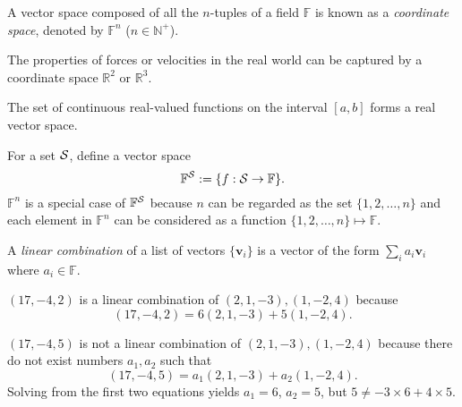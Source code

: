 \begin{defn}
  \label{def:coordinateSpace}
  A vector space composed of all the $n$-tuples of a field
  $\mathbb{F}$
  is known as a \emph{coordinate space},
  denoted by $\mathbb{F}^n$ ($n\in \mathbb{N}^+$).
\end{defn}

\begin{exm}
  The properties of forces or velocities in the real world
  can be captured by a coordinate space $\mathbb{R}^2$ or $\mathbb{R}^3$.
\end{exm}

\begin{exm}
  The set of continuous real-valued functions
  on the interval $[a,b]$ forms a real vector space.
\end{exm}

\begin{ntn}
  \label{ntn:powerSetNotation}
  For a set ${\cal S}$, define a vector space
  \begin{equation*}
    \mathbb{F}^{{\cal S}} := \{ f:{\cal S}\rightarrow \mathbb{F}\}.
  \end{equation*}
  $\mathbb{F}^n$ is a special case of $\mathbb{F}^{{\cal S}}$
  because $n$ can be regarded as the set $\{1,2,\ldots,n\}$
  and each element in $\mathbb{F}^n$
  can be considered as a function $\{1,2,\ldots,n\}\mapsto \mathbb{F}$.
\end{ntn}

\begin{defn}
  A \emph{linear combination} of a list
  of vectors $\{\mathbf{v}_i\}$ is a vector of the form
  $\sum_ia_i\mathbf{v}_i$ where $a_i\in \mathbb{F}$.
\end{defn}

\begin{exm}
  $(17,-4,2)$ is a linear combination of $(2,1,-3),(1,-2,4)$ because
  \begin{equation*}
    (17,-4,2) = 6(2,1,-3)+5(1,-2,4).
  \end{equation*}
\end{exm}

\begin{exm}
  $(17,-4,5)$ is not a linear combination of $(2,1,-3),(1,-2,4)$
  because there do not exist numbers $a_1, a_2$ such that
  \begin{equation*}
    (17,-4,5) = a_1(2,1,-3)+a_2(1,-2,4).
  \end{equation*}
  Solving from the first two equations yields
  $a_1=6$, $a_2=5$, but $5\ne -3\times 6 + 4\times 5$.
\end{exm}


